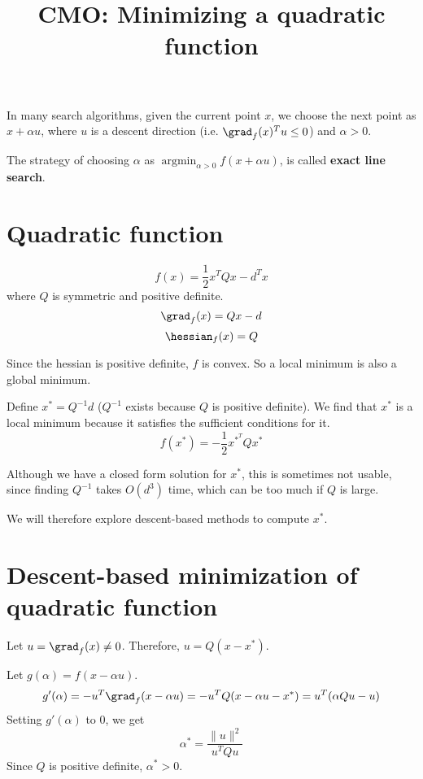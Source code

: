 


\title{CMO: Minimizing a quadratic function}



\maketitle
\initMinimal{}

In many search algorithms, given the current point $x$,
we choose the next point as $x + \alpha u$, where
$u$ is a descent direction (i.e. $\grad_f(x)^T u \le 0$) and $\alpha > 0$.

The strategy of choosing $\alpha$ as $\operatorname{argmin}_{\alpha > 0} f(x + \alpha u)$,
is called \textbf{exact line search}.

\section{Quadratic function}

\[ f(x) = \frac{1}{2}x^TQx - d^Tx \]
where $Q$ is symmetric and positive definite.
\[ \grad_f(x) = Qx - d \]
\[ \hessian_f(x) = Q \]

Since the hessian is positive definite, $f$ is convex.
So a local minimum is also a global minimum.

Define $x^* = Q^{-1}d$ ($Q^{-1}$ exists because $Q$ is positive definite).
We find that $x^*$ is a local minimum because it satisfies the sufficient conditions for it.
\[ f(x^*) = - \frac{1}{2}x^{*^T} Q x^* \]

Although we have a closed form solution for $x^*$,
this is sometimes not usable, since finding $Q^{-1}$ takes $O(d^3)$ time,
which can be too much if $Q$ is large.

We will therefore explore descent-based methods to compute $x^*$.

\section{Descent-based minimization of quadratic function}

Let $u = \grad_f(x) \neq 0$. Therefore, $u = Q(x - x^*)$.

Let $g(\alpha) = f(x - \alpha u)$.
\[ g'(\alpha) = - u^T \grad_f(x - \alpha u)
= - u^T Q (x - \alpha u - x^*) = u^T (\alpha Q u - u) \]
Setting $g'(\alpha)$ to 0, we get
\[ \alpha^* = \frac{\|u\|^2}{u^TQu} \]
Since $Q$ is positive definite, $\alpha^* > 0$.

